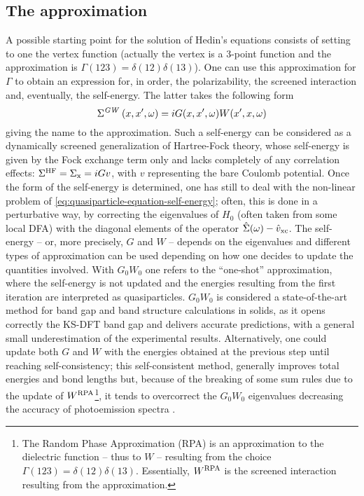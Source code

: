 \subsection{The \gw approximation\label{sec:gw}}
A possible starting point for the solution of Hedin's equations consists of setting to one the vertex function (actually the vertex is a 3-point function and the approximation is $\Gamma(123)=\delta(12)\delta(13)$). One can use this approximation for $\Gamma$ to obtain an expression for, in order, the polarizability, the screened interaction and, eventually, the self-energy. The latter takes the following form
%
\begin{equation}
    \Sigma^{\emph{GW~}}(x,x',\omega) = i G(x,x',\omega) W(x',x,\omega)
    \label{eq:gw-approx}
\end{equation}
%
giving the name to the \gw approximation. Such a self-energy can be considered as a dynamically screened generalization of Hartree-Fock theory, whose self-energy is given by the Fock exchange term only and lacks completely of any correlation effects: $\Sigma^{\rm HF} = \Sigma_{\rm x} = i G v$, with $v$ representing the bare Coulomb potential. Once the form of the self-energy is determined, one has still to deal with the non-linear problem of \cref{eq:quasiparticle-equation-self-energy}; often, this is done in a perturbative way, by correcting the eigenvalues of $H_0$ (often taken from some local DFA) with the diagonal elements of the operator $\hat{\Sigma}(\omega) - \hat{v}_{\rm xc}$. The self-energy -- or, more precisely, $G$ and $W$ -- depends on the eigenvalues and different types of approximation can be used depending on how one decides to update the quantities involved. With $G_0 W_0$ one refers to the ``one-shot'' \gw approximation, where the self-energy is not updated and the energies resulting from the first iteration are interpreted as quasiparticles. $G_0 W_0$ is considered a state-of-the-art method for band gap and band structure calculations in solids, as it opens correctly the KS-DFT band gap and delivers accurate predictions, with a general small underestimation of the experimental results. Alternatively, one could update both $G$ and $W$ with the energies obtained at the previous step until reaching self-consistency; this self-consistent \gw method, generally improves total energies and bond lengths but, because of the breaking of some sum rules due to the update of $W^{\rm RPA}$\footnote{The Random Phase Approximation (RPA) is an approximation to the dielectric function -- thus to $W$ -- resulting from the choice $\Gamma(123)=\delta(12)\delta(13)$. Essentially, $W^{\rm RPA}$ is the screened interaction resulting from the \gw approximation.}, it tends to overcorrect the $G_0 W_0$ eigenvalues decreasing the accuracy of photoemission spectra \cite{shishkin_self-consistent_2007}.

